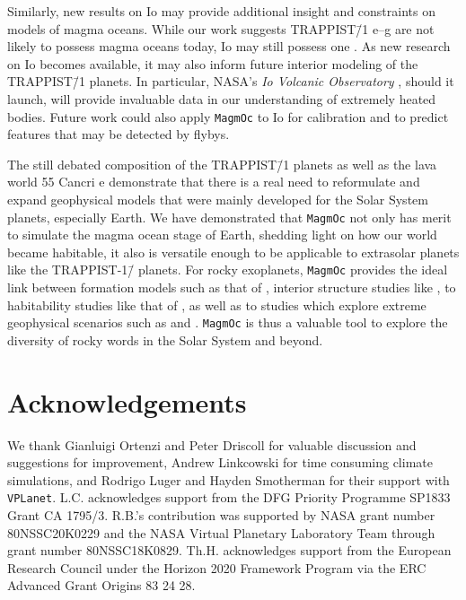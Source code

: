 \documentclass[paper=letterpaper,fontsize=12pt,oneside,twocolumn]{article}
\newcommand{\vplanet}{\texttt{\footnotesize{VPLanet}}}
\newcommand{\magmoc}{\texttt{\footnotesize{MagmOc}}}
\begin{document}
Similarly, new results on Io may provide additional insight and constraints on models of magma oceans. While our work suggests TRAPPIST\=/1 e--g are not likely to possess magma oceans today, Io may still possess one \citep{Khurana11,Tyler15}. As new research on Io becomes available, it may also inform future interior modeling of the TRAPPIST\=/1 planets. In particular, NASA's \emph{Io Volcanic Observatory} \citep{McEwen14}, should it launch, will provide invaluable data in our understanding of extremely heated bodies. Future work could also apply \magmoc{} to Io for calibration and to predict features that may be detected by flybys.

The still debated composition of the TRAPPIST\=/1 planets as well as the lava world 55 Cancri e demonstrate that there is a real need to reformulate and expand geophysical models that were mainly developed for the Solar System planets, especially Earth. We have demonstrated that \magmoc{} not only has merit to simulate the magma ocean stage of Earth, shedding light on how our world became habitable, it also is versatile enough to be applicable to extrasolar planets like the TRAPPIST-1\=/ planets. For rocky exoplanets, \magmoc{} provides the ideal link between formation models such as that of \citet{Miguel2020}, interior structure studies like \citet{Noack2016,Dorn2018,Unterborn2018}, to habitability studies like that of \citet{lingam2020}, as well as to studies which explore extreme geophysical scenarios such as \citet{Kislyakova2017} and \citet{Millholland2019}. \magmoc{} is thus a valuable tool to explore the diversity of rocky words in the Solar System and beyond.

\section*{Acknowledgements}

We thank Gianluigi Ortenzi and Peter Driscoll for valuable discussion and suggestions for improvement, Andrew Linkcowski for time consuming climate simulations, and Rodrigo Luger and Hayden Smotherman for their support with \vplanet{}.
L.C. acknowledges support from the DFG Priority Programme SP1833 Grant CA 1795/3.
R.B.'s contribution was supported by NASA grant number 80NSSC20K0229 and the NASA Virtual Planetary Laboratory Team through grant number 80NSSC18K0829.
Th.H. acknowledges support from the European Research Council under the Horizon 2020 Framework Program via the ERC Advanced Grant Origins 83 24 28.
\end{document}
